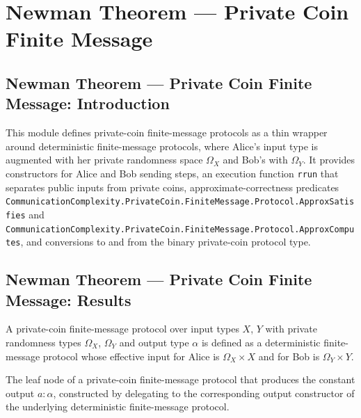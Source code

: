 \section{Newman Theorem --- Private Coin Finite Message}
\subsection*{Newman Theorem --- Private Coin Finite Message: Introduction}

This module defines private-coin finite-message protocols as a thin wrapper around
deterministic finite-message protocols, where Alice's input type is augmented with her
private randomness space $\Omega_X$ and Bob's with $\Omega_Y$.  It provides
constructors for Alice and Bob sending steps, an execution function \texttt{rrun} that
separates public inputs from private coins, approximate-correctness predicates
\texttt{CommunicationComplexity.PrivateCoin.FiniteMessage.Protocol.ApproxSatisfies} and \texttt{CommunicationComplexity.PrivateCoin.FiniteMessage.Protocol.ApproxComputes}, and conversions to and from the
binary private-coin protocol type.

\subsection*{Newman Theorem --- Private Coin Finite Message: Results}

\begin{definition}
\label{CommunicationComplexity.PrivateCoin.FiniteMessage.Protocol}
\leanok
{}
A private-coin finite-message protocol over input types $X$, $Y$ with private
randomness types $\Omega_X$, $\Omega_Y$ and output type $\alpha$ is defined as a
deterministic finite-message protocol whose effective input for Alice is
$\Omega_X \times X$ and for Bob is $\Omega_Y \times Y$.
\end{definition}

\begin{definition}
\label{CommunicationComplexity.PrivateCoin.FiniteMessage.Protocol.output}
\leanok
{}
The leaf node of a private-coin finite-message protocol that produces the constant
output $a : \alpha$, constructed by delegating to the corresponding output constructor
of the underlying deterministic finite-message protocol.
\end{definition}

